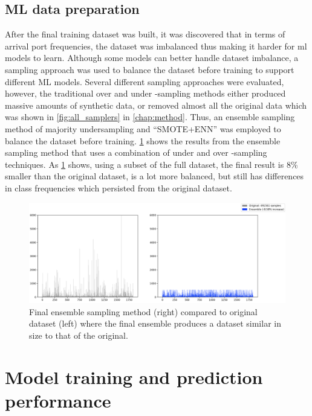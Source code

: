 \subsection{ML data preparation}

After the final training dataset was built, it was discovered that in terms of arrival port frequencies, the dataset was imbalanced thus making it harder for \acrshort{ml} models to learn. Although some models can better handle dataset imbalance, a sampling approach was used to balance the dataset before training to support different ML models. Several different sampling approaches were evaluated, however, the traditional over and under -sampling methods either produced massive amounts of synthetic data, or removed almost all the original data which was shown in \cref{fig:all_samplers} in \cref{chap:method}. Thus, an ensemble sampling method of majority undersampling and ``SMOTE+ENN'' was employed to balance the dataset before training. \cref{fig:ensemble_sampler} shows the results from the ensemble sampling method that uses a combination of under and over -sampling techniques. As \cref{fig:ensemble_sampler} shows, using a subset of the full dataset, the final result is 8\% smaller than the original dataset, is a lot more balanced, but still has differences in class frequencies which persisted from the original dataset.

\begin{figure}[htbp]
    \centering
    \includegraphics[width=1.0\textwidth]{figures/imbalance/ensemble}
    \caption{Final ensemble sampling method (right) compared to original dataset (left) where the final ensemble produces a dataset similar in size to that of the original.}
    \label{fig:ensemble_sampler}
\end{figure}

\section{Model training and prediction performance}

